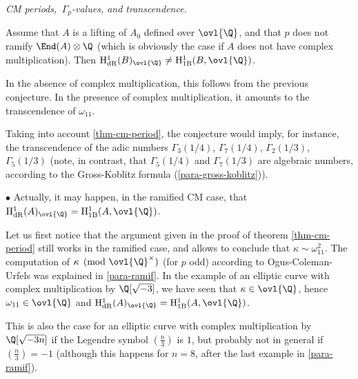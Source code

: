 \begin{para} {\itshape CM periods, $\,\Gamma_p$-values, and transcendence.}
\begin{coj}\label{coj-no-complex-multi}
Assume that $A$ is a lifting of $A_0$ defined over $\ovl{\Q}$, and that
$p$ does not ramify $\End(A)\otimes \Q$ (which is obviously the case if
$A$ does not have complex multiplication). Then
$\mathrm{H}^1_{\mathrm{dR}}(B)_{\ovl{\Q}}\neq
\mathrm{H}^1_{1\mathrm{B}}(B,{\ovl{\Q}})$.
\end{coj} 

\noindent In the absence of complex multiplication, this follows from the previous conjecture.
In the presence of complex multiplication, it amounts to the transcendence of $\omega_{11}$. 

 \noindent Taking into account \ref{thm-cm-period}, the conjecture would
 imply, for instance, the transcendence of the
 adic numbers $\Gamma_3(1/4)$, $\Gamma_7(1/4)$, $\Gamma_2(1/3)$,
 $\Gamma_5(1/3)$ (note, in contrast,
 that $\Gamma_5(1/4)$ and $\Gamma_7(1/3)$ are algebraic numbers,
 according to the Gross-Koblitz formula (\ref{para-gross-koblitz})).

 
 \noindent $\bullet$ Actually, it may happen, in the ramified CM case, that
 $\mathrm{H}^1_{\mathrm{dR}}(A)_{\ovl{\Q}}=
 \mathrm{H}^1_{1\mathrm{B}}(A,{\ovl{\Q}})$. 

 \noindent Let us first notice that the argument given in the proof of theorem
 \ref{thm-cm-period} still works in the ramified case, and allows to
 conclude that $\kappa \sim  \omega_{11}^2$. The computation of $\kappa
 \pmod{{\ovl{\Q}}^\times}$ (for $p$ odd) according to
 Ogus-Coleman-Urfels was explained in \ref{para-ramif}. In the example
 of an elliptic curve with complex multiplication by $\Q[\sqrt{-3}]$, we
 have seen that $\kappa\in \ovl{\Q}$, hence $\omega_{11}\in \ovl{\Q}$
 and $\mathrm{H}^1_{\mathrm{dR}}(A)_{\ovl{\Q}}= 
 \mathrm{H}^1_{1\mathrm{B}}(A,{\ovl{\Q}})$. 

This is also the case for an elliptic curve with complex multiplication
 by $\Q[\sqrt{-3n}]$ 
if the Legendre symbol $(\frac{n}{3})$ is $1$, but probably not in general if
$(\frac{n}{3})=-1$ (although this happens for $n=8$, after the last example in
\ref{para-ramif}).
\end{para}

